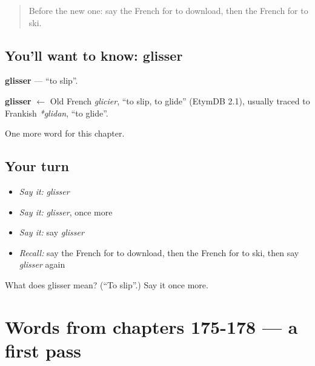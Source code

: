 \label{lesson:FR-C183-glisser}



\begin{quote}
Before the new one: say the French for to download, then the French for to ski.
\end{quote}

\subsection*{You'll want to know: glisser}
\textbf{glisser} — \textquotedblleft{}to slip\textquotedblright{}.

\begin{cousinweb}
\textbf{glisser} $\leftarrow$ Old French \emph{glicier}, \textquotedblleft{}to slip, to glide\textquotedblright{} (EtymDB 2.1), usually traced to Frankish \emph{*glidan}, \textquotedblleft{}to glide\textquotedblright{}.
\end{cousinweb}

\begin{grammarlens}[title={What you've built}]
One more word for this chapter.
\end{grammarlens}

\subsection*{Your turn}
\begin{itemize}
\raggedright
  \item \emph{Say it:} \emph{glisser}
  \item \emph{Say it:} \emph{glisser}, once more
  \item \emph{Say it:} say \emph{glisser}
  \item \emph{Recall:} say the French for to download, then the French for to ski, then say \emph{glisser} again
\end{itemize}

\begin{tcolorbox}[breakable,colback=teal!4,colframe=teal!35!black,title={Before you move on}]
What does glisser mean? (\textquotedblleft{}To slip\textquotedblright{}.) Say it once more.
\end{tcolorbox}
\section[(dialogue)]{Words from chapters 175-178 — a first pass}

\label{lesson:FR-R183-first-pass-words-from-chapters-175-178}



